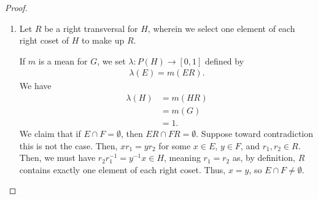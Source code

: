 \begin{proof}\hfill
  \begin{enumerate}[(1)]
    \item Let $R$ be a right transversal for $H$, wherein we select one element of each right coset of $H$ to make up $R$.\newline

      If $m$ is a mean for $G$, we set $\lambda\colon P(H)\rightarrow [0,1]$ defined by
      \begin{align*}
        \lambda(E) = m\left(ER\right).
      \end{align*}
       We have
      \begin{align*}
        \lambda(H) &= m\left(HR\right)\\
                   &= m\left(G\right)\\
                   &= 1.
      \end{align*}
      We claim that if $E\cap F = \emptyset$, then $ER \cap FR = \emptyset$. Suppose toward contradiction this is not the case. Then, $xr_1 = yr_2$ for some $x\in E$, $y\in F$, and $r_1,r_2\in R$. Then, we must have $r_2r_1^{-1} = y^{-1}x \in H$, meaning $r_1 = r_2$ as, by definition, $R$ contains exactly one element of each right coset. Thus, $x=y$, so $E\cap F \neq \emptyset$.\newline


\end{enumerate}
\end{proof}

